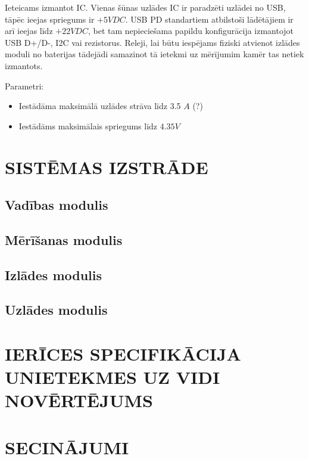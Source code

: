 \documentclass[12pt,fleqn,titlepage,oneside]{article}
\numberwithin{equation}{section}
\numberwithin{figure}{section}
\numberwithin{table}{section}
\begin{document}
Ieteicams izmantot IC. Vienas šūnas uzlādes IC ir paradzēti uzlādei no USB, tāpēc ieejas spriegums ir $+5VDC$. USB PD standartiem atbilstoši lādētājiem ir arī ieejas līdz $+22VDC$, bet tam nepieciešama papildu konfigurācija izmantojot USB D+/D-, I2C vai rezistorus. Releji, lai būtu iespējams fiziski atvienot izlādes moduli no baterijas tādejādi samazinot tā ietekmi uz mērījumim kamēr tas netiek izmantots.

Parametri:
\begin{itemize}
	\item Iestādāma maksimālā uzlādes strāva līdz 3.5 $A$ (?) %
	\item Iestādāms maksimālais spriegums līdz $4.35 V$
\end{itemize}


\FloatBarrier
\newpage
\section{\texorpdfstring{\MakeUppercase{Sistēmas izstrāde}}{Sistēmas izstrāde}}

\subsection{Vadības modulis}

\subsection{Mērīšanas modulis}

\subsection{Izlādes modulis}

\subsection{Uzlādes modulis}

\FloatBarrier
\newpage
\section{\texorpdfstring{\MakeUppercase{Ierīces specifikācija un\newline ietekmes uz vidi novērtējums}}{Ierīces specifikācija un ietekmes uz vidi novērtējums}}


\FloatBarrier
\newpage
\section{\texorpdfstring{\MakeUppercase{Secinājumi}}{Secinājumi}}
\end{document}
